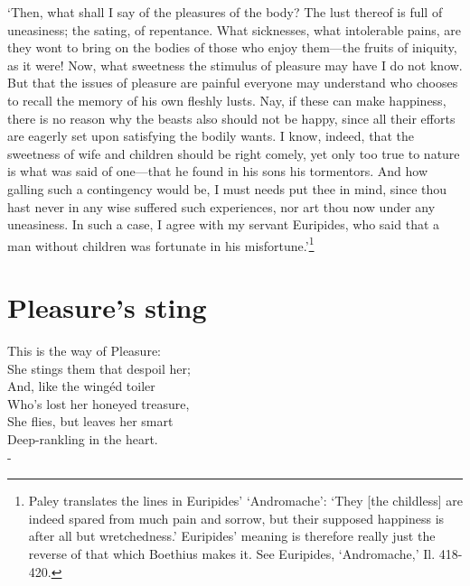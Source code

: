 \documentclass[12pt]{book}
\newenvironment{vpoem}[1]%
  {\def\poemvsindentlines{#1}\begin{poem}\small}%
  {\end{poem}\def\poemvsindentlines{\relax}}
\begin{document}
`Then, what shall I say of the pleasures of the body? The lust       
thereof is full of uneasiness; the sating, of repentance. What          
sicknesses, what intolerable pains, are they wont to bring on the       
bodies of those who enjoy them---the fruits of iniquity, as it were!     
Now, what sweetness the stimulus of pleasure may have I do not know.    
But that the issues of pleasure are painful everyone may understand     
who chooses to recall the memory of his own fleshly lusts. Nay, if      
these can make happiness, there is no reason why the beasts also        
should not be happy, since all their efforts are eagerly set upon       
satisfying the bodily wants. I know, indeed, that the sweetness of      
wife and children should be right comely, yet only too true to nature   
is what was said of one---that he found in his sons his tormentors.      
And how galling such a contingency would be, I must needs put thee in   
mind, since thou hast never in any wise suffered such experiences,      
nor art thou now under any uneasiness. In such a case, I agree with     
my servant Euripides, who said that a man without children was          
fortunate in his misfortune.'\footnote{Paley translates the lines in    
Euripides' `Andromache': `They [the childless] are indeed spared from   
much pain and sorrow, but their supposed happiness is after all but     
wretchedness.' Euripides' meaning is therefore really just the reverse  
of that which Boethius makes it. See Euripides, `Andromache,' Il.       
418-420.}                                                               






\section{Pleasure's sting}

\begin{vpoem}{14}
        This is the way of Pleasure: \\
    She stings them that despoil her; \\
    And, like the wingéd toiler \\
        Who's lost her honeyed treasure, \\
      She flies, but leaves her smart \\
      Deep-rankling in the heart. \\-
\end{vpoem}
\end{document}
